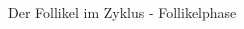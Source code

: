 \documentclass{beamer}
\begin{document}
\begin{frame}{Der Follikel im Zyklus - Follikelphase}
\begin{columns}[c]
\begin{column}{7cm}
\begin{itemize}
\end{itemize}
\end{column}
\end{columns}






    
\end{frame}






















\end{document}
